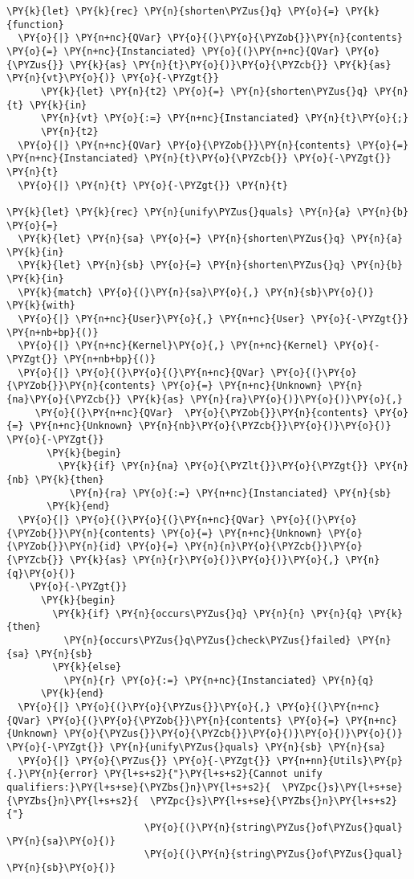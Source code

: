 \begin{Verbatim}[commandchars=\\\{\}]
\PY{k}{let} \PY{k}{rec} \PY{n}{shorten\PYZus{}q} \PY{o}{=} \PY{k}{function}
  \PY{o}{|} \PY{n+nc}{QVar} \PY{o}{(}\PY{o}{\PYZob{}}\PY{n}{contents} \PY{o}{=} \PY{n+nc}{Instanciated} \PY{o}{(}\PY{n+nc}{QVar} \PY{o}{\PYZus{}} \PY{k}{as} \PY{n}{t}\PY{o}{)}\PY{o}{\PYZcb{}} \PY{k}{as} \PY{n}{vt}\PY{o}{)} \PY{o}{-\PYZgt{}}
      \PY{k}{let} \PY{n}{t2} \PY{o}{=} \PY{n}{shorten\PYZus{}q} \PY{n}{t} \PY{k}{in}
      \PY{n}{vt} \PY{o}{:=} \PY{n+nc}{Instanciated} \PY{n}{t}\PY{o}{;}
      \PY{n}{t2}
  \PY{o}{|} \PY{n+nc}{QVar} \PY{o}{\PYZob{}}\PY{n}{contents} \PY{o}{=} \PY{n+nc}{Instanciated} \PY{n}{t}\PY{o}{\PYZcb{}} \PY{o}{-\PYZgt{}} \PY{n}{t}
  \PY{o}{|} \PY{n}{t} \PY{o}{-\PYZgt{}} \PY{n}{t}

\PY{k}{let} \PY{k}{rec} \PY{n}{unify\PYZus{}quals} \PY{n}{a} \PY{n}{b} \PY{o}{=}
  \PY{k}{let} \PY{n}{sa} \PY{o}{=} \PY{n}{shorten\PYZus{}q} \PY{n}{a} \PY{k}{in}
  \PY{k}{let} \PY{n}{sb} \PY{o}{=} \PY{n}{shorten\PYZus{}q} \PY{n}{b} \PY{k}{in}
  \PY{k}{match} \PY{o}{(}\PY{n}{sa}\PY{o}{,} \PY{n}{sb}\PY{o}{)} \PY{k}{with}
  \PY{o}{|} \PY{n+nc}{User}\PY{o}{,} \PY{n+nc}{User} \PY{o}{-\PYZgt{}} \PY{n+nb+bp}{()}
  \PY{o}{|} \PY{n+nc}{Kernel}\PY{o}{,} \PY{n+nc}{Kernel} \PY{o}{-\PYZgt{}} \PY{n+nb+bp}{()}
  \PY{o}{|} \PY{o}{(}\PY{o}{(}\PY{n+nc}{QVar} \PY{o}{(}\PY{o}{\PYZob{}}\PY{n}{contents} \PY{o}{=} \PY{n+nc}{Unknown} \PY{n}{na}\PY{o}{\PYZcb{}} \PY{k}{as} \PY{n}{ra}\PY{o}{)}\PY{o}{)}\PY{o}{,}
     \PY{o}{(}\PY{n+nc}{QVar}  \PY{o}{\PYZob{}}\PY{n}{contents} \PY{o}{=} \PY{n+nc}{Unknown} \PY{n}{nb}\PY{o}{\PYZcb{}}\PY{o}{)}\PY{o}{)} \PY{o}{-\PYZgt{}}
       \PY{k}{begin}
         \PY{k}{if} \PY{n}{na} \PY{o}{\PYZlt{}}\PY{o}{\PYZgt{}} \PY{n}{nb} \PY{k}{then}
           \PY{n}{ra} \PY{o}{:=} \PY{n+nc}{Instanciated} \PY{n}{sb}
       \PY{k}{end}
  \PY{o}{|} \PY{o}{(}\PY{o}{(}\PY{n+nc}{QVar} \PY{o}{(}\PY{o}{\PYZob{}}\PY{n}{contents} \PY{o}{=} \PY{n+nc}{Unknown} \PY{o}{\PYZob{}}\PY{n}{id} \PY{o}{=} \PY{n}{n}\PY{o}{\PYZcb{}}\PY{o}{\PYZcb{}} \PY{k}{as} \PY{n}{r}\PY{o}{)}\PY{o}{)}\PY{o}{,} \PY{n}{q}\PY{o}{)}
    \PY{o}{-\PYZgt{}}
      \PY{k}{begin}
        \PY{k}{if} \PY{n}{occurs\PYZus{}q} \PY{n}{n} \PY{n}{q} \PY{k}{then}
          \PY{n}{occurs\PYZus{}q\PYZus{}check\PYZus{}failed} \PY{n}{sa} \PY{n}{sb}
        \PY{k}{else}
          \PY{n}{r} \PY{o}{:=} \PY{n+nc}{Instanciated} \PY{n}{q}
      \PY{k}{end}
  \PY{o}{|} \PY{o}{(}\PY{o}{\PYZus{}}\PY{o}{,} \PY{o}{(}\PY{n+nc}{QVar} \PY{o}{(}\PY{o}{\PYZob{}}\PY{n}{contents} \PY{o}{=} \PY{n+nc}{Unknown} \PY{o}{\PYZus{}}\PY{o}{\PYZcb{}}\PY{o}{)}\PY{o}{)}\PY{o}{)} \PY{o}{-\PYZgt{}} \PY{n}{unify\PYZus{}quals} \PY{n}{sb} \PY{n}{sa}
  \PY{o}{|} \PY{o}{\PYZus{}} \PY{o}{-\PYZgt{}} \PY{n+nn}{Utils}\PY{p}{.}\PY{n}{error} \PY{l+s+s2}{"}\PY{l+s+s2}{Cannot unify qualifiers:}\PY{l+s+se}{\PYZbs{}n}\PY{l+s+s2}{  \PYZpc{}s}\PY{l+s+se}{\PYZbs{}n}\PY{l+s+s2}{  \PYZpc{}s}\PY{l+s+se}{\PYZbs{}n}\PY{l+s+s2}{"}
                        \PY{o}{(}\PY{n}{string\PYZus{}of\PYZus{}qual} \PY{n}{sa}\PY{o}{)}
                        \PY{o}{(}\PY{n}{string\PYZus{}of\PYZus{}qual} \PY{n}{sb}\PY{o}{)}
\end{Verbatim}

